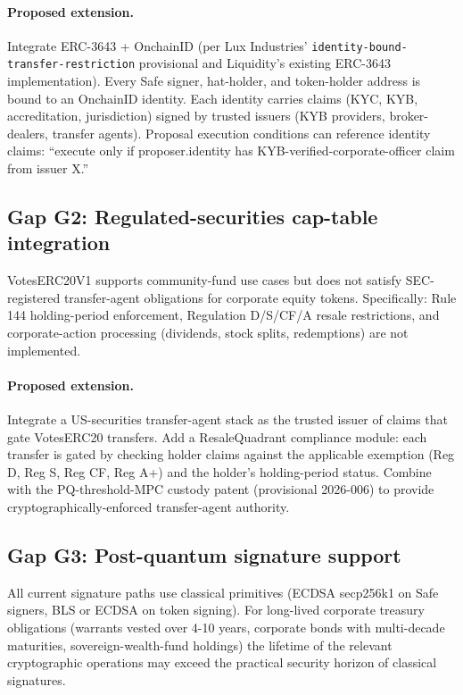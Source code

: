 \documentclass[11pt,letterpaper]{article}
\begin{document}
\paragraph{Proposed extension.} Integrate ERC-3643 + OnchainID (per Lux Industries' \texttt{identity-bound-transfer-restriction} provisional and Liquidity's existing ERC-3643 implementation). Every Safe signer, hat-holder, and token-holder address is bound to an OnchainID identity. Each identity carries claims (KYC, KYB, accreditation, jurisdiction) signed by trusted issuers (KYB providers, broker-dealers, transfer agents). Proposal execution conditions can reference identity claims: ``execute only if proposer.identity has KYB-verified-corporate-officer claim from issuer X.''

\subsection{Gap G2: Regulated-securities cap-table integration}

VotesERC20V1 supports community-fund use cases but does not satisfy SEC-registered transfer-agent obligations for corporate equity tokens. Specifically: Rule 144 holding-period enforcement, Regulation D/S/CF/A resale restrictions, and corporate-action processing (dividends, stock splits, redemptions) are not implemented.

\paragraph{Proposed extension.} Integrate a US-securities transfer-agent stack as the trusted issuer of claims that gate VotesERC20 transfers. Add a ResaleQuadrant compliance module: each transfer is gated by checking holder claims against the applicable exemption (Reg D, Reg S, Reg CF, Reg A+) and the holder's holding-period status. Combine with the PQ-threshold-MPC custody patent (provisional 2026-006) to provide cryptographically-enforced transfer-agent authority.

\subsection{Gap G3: Post-quantum signature support}

All current signature paths use classical primitives (ECDSA secp256k1 on Safe signers, BLS or ECDSA on token signing). For long-lived corporate treasury obligations (warrants vested over 4-10 years, corporate bonds with multi-decade maturities, sovereign-wealth-fund holdings) the lifetime of the relevant cryptographic operations may exceed the practical security horizon of classical signatures.
\end{document}
